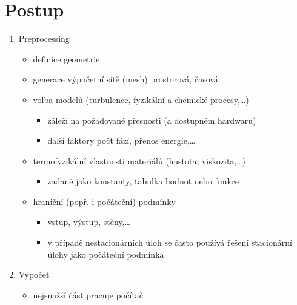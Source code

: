 \documentclass[letterpaper,10pt,czech]{sphinxmanual}
\begin{document}
\section{Postup}
\label{\detokenize{prednaska_23092022:postup}}\begin{enumerate}
%
\item {} 
\sphinxAtStartPar
Pre\sphinxhyphen{}processing
\begin{itemize}
\item {} 
\sphinxAtStartPar
definice geometrie

\item {} 
\sphinxAtStartPar
generace výpočetní sítě (mesh) \sphinxhyphen{} prostorová, časová

\item {} 
\sphinxAtStartPar
volba modelů (turbulence, fyzikální a chemické procesy,…)
\begin{itemize}
\item {} 
\sphinxAtStartPar
záleží na požadované přesnosti (a dostupném hardwaru)

\item {} 
\sphinxAtStartPar
další faktory \sphinxhyphen{} počt fází, přenos energie,…

\end{itemize}

\item {} 
\sphinxAtStartPar
termofyzikální vlastnosti materiálů (hustota, viskozita,…)
\begin{itemize}
\item {} 
\sphinxAtStartPar
zadané jako konstanty, tabulka hodnot nebo funkce

\end{itemize}

\item {} 
\sphinxAtStartPar
hraniční (popř. i počáteční) podmínky
\begin{itemize}
\item {} 
\sphinxAtStartPar
vstup, výstup, stěny,…

\item {} 
\sphinxAtStartPar
v případě nestacionárních úloh se často používá řešení stacionární úlohy jako počáteční podmínka

\end{itemize}

\end{itemize}

\item {} 
\sphinxAtStartPar
Výpočet
\begin{itemize}
\item {} 
\sphinxAtStartPar
nejsnažší část \sphinxhyphen{} pracuje počítač


\end{itemize}
\end{enumerate}
\end{document}
